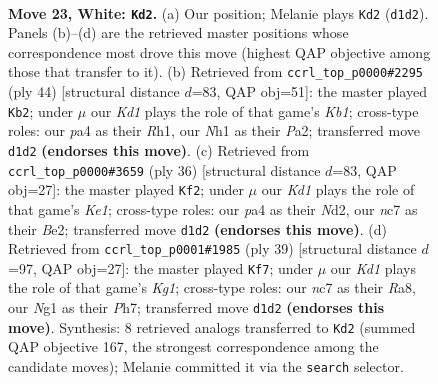 \documentclass[11pt]{article}
\begin{document}
\clearpage

\begin{figure}[p]\centering
\begin{subfigure}{0.46\textwidth}\centering
\resizebox{\linewidth}{!}{%
\newchessgame
\chessboard[
  setfen={r2k1b2/2n1n1pr/6b1/7p/p1B1pP1P/P3R3/1P4P1/R2K2NN w - - 6 23},
  showmover=false,
  pgfstyle=straightmove, color=movearrow, markmove={d1-d2}
]}
\caption{}
\end{subfigure}\hfill
\begin{subfigure}{0.46\textwidth}\centering
\resizebox{\linewidth}{!}{%
\newchessgame
\chessboard[
  setfen={4b2r/1pr1kpR1/p3p2p/1n2P3/5P2/1N6/P1P1B1PP/1K5R w - - 1 23},
  showmover=false,
  pgfstyle=straightmove, color=movearrow, markmove={b1-b2}
]}
\caption{}
\end{subfigure}
\\[4pt]
\begin{subfigure}{0.46\textwidth}\centering
\resizebox{\linewidth}{!}{%
\newchessgame
\chessboard[
  setfen={2r4r/pp1bkpp1/2n1p1p1/8/1P3P2/P3P3/3NB1PP/2R1K2R w K - 1 19},
  showmover=false,
  pgfstyle=straightmove, color=movearrow, markmove={e1-f2}
]}
\caption{}
\end{subfigure}\hfill
\begin{subfigure}{0.46\textwidth}\centering
\resizebox{\linewidth}{!}{%
\newchessgame
\chessboard[
  setfen={r3r1k1/1p5p/p2b1pp1/3p3n/3N4/3PB2P/PP3PP1/R3RK2 b - - 1 20},
  showmover=false,
  pgfstyle=straightmove, color=movearrow, markmove={g8-f7}
]}
\caption{}
\end{subfigure}
\caption{\textbf{Move 23, White: \texttt{Kd2}.} (a) Our position; Melanie plays \texttt{Kd2} (\texttt{d1d2}). Panels (b)--(d) are the retrieved master positions whose correspondence most drove this move (highest QAP objective among those that transfer to it). (b) Retrieved from \texttt{ccrl\_top\_p0000\#2295} (ply 44) [structural distance $d$=83, QAP obj=51]: the master played \texttt{Kb2}; under $\mu$ our \emph{Kd1} plays the role of that game's \emph{Kb1}; cross-type roles: our \emph{p}a4 as their \emph{R}h1, our \emph{N}h1 as their \emph{P}a2; transferred move \texttt{d1d2} \textbf{(endorses this move)}. (c) Retrieved from \texttt{ccrl\_top\_p0000\#3659} (ply 36) [structural distance $d$=83, QAP obj=27]: the master played \texttt{Kf2}; under $\mu$ our \emph{Kd1} plays the role of that game's \emph{Ke1}; cross-type roles: our \emph{p}a4 as their \emph{N}d2, our \emph{n}c7 as their \emph{B}e2; transferred move \texttt{d1d2} \textbf{(endorses this move)}. (d) Retrieved from \texttt{ccrl\_top\_p0001\#1985} (ply 39) [structural distance $d$=97, QAP obj=27]: the master played \texttt{Kf7}; under $\mu$ our \emph{Kd1} plays the role of that game's \emph{Kg1}; cross-type roles: our \emph{n}c7 as their \emph{R}a8, our \emph{N}g1 as their \emph{P}h7; transferred move \texttt{d1d2} \textbf{(endorses this move)}. Synthesis: 8 retrieved analogs transferred to \texttt{Kd2} (summed QAP objective 167, the strongest correspondence among the candidate moves); Melanie committed it via the \texttt{search} selector.}
\label{fig:thought-m44}
\end{figure}
\end{document}
